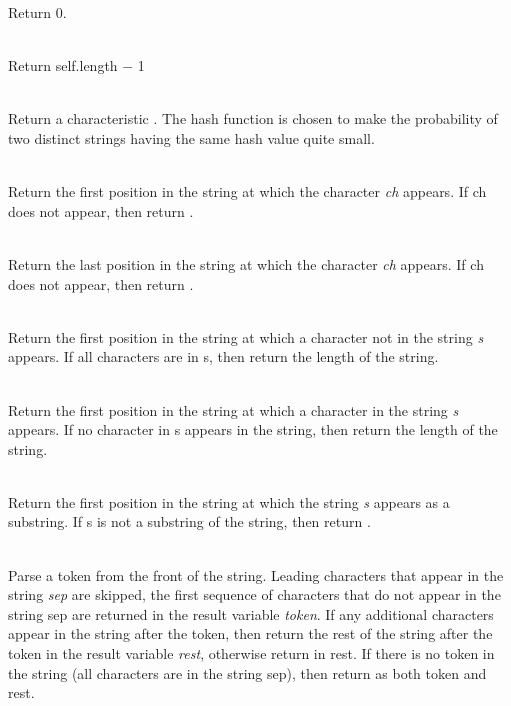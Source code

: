 \begin{desc}
    Return 0.
  \item[\kw{function} upperbound \returns{} \/\LB{}\tn{Integer}\/\RB{}]~\\
    Return self.length $-$ 1
  \item[\kw{function} hash \returns{} \/\LB{}\tn{Integer}\/\RB{}]~\\
    Return a characteristic .  The hash function is chosen to
    make the probability of two distinct strings having the same hash value
    quite small.
  \item[\kw{function} index\/\LB{}ch \CO{} \tn{Character}\/\RB{} \returns{} \/\LB{}r \CO{} \tn{Integer}\/\RB{}]~\\
    Return the first position in the string at which the character {\it ch}
    appears.  If ch does not appear, then return .
  \item[\kw{function} rindex\/\LB{}ch \CO{} \tn{Character}\/\RB{} \returns{}
	  \/\LB{}r \CO{} \tn{Integer}\/\RB{}]~\\
    Return the last position in the string at which the character {\it ch}
    appears.  If ch does not appear, then return .
  \item[\kw{function} span\/\LB{}s \CO{} \tn{String}\/\RB{} \returns{} \/\LB{}r \CO{} \tn{Integer}\/\RB{}]~\\
    Return the first position in the string at which a character not in the
    string {\it s} appears.  If all characters are in s, then return the
    length of the string.
  \item[\kw{function} cspan\/\LB{}s \CO{} \tn{String}\/\RB{} \returns{} \/\LB{}r \CO{} \tn{Integer}\/\RB{}]~\\
    Return the first position in the string at which a character in the
    string {\it s} appears.  If no character in s appears in the string,
    then return the length of the string.
  \item[\kw{function} str\/\LB{}s \CO{} \tn{String}\/\RB{} \returns{} \/\LB{}r \CO{} \tn{Integer}\/\RB{}]~\\
    Return the first position in the string at which the string {\it s}
    appears as a substring.  If s is not a substring of the string, then
    return .
  \item[\kw{operation} token\/\LB{}sep \CO{} \tn{String}\/\RB{} \returns{} \/\LB{}token \CO{} \tn{String}, rest\CO{} \tn{String}\/\RB{}]~\\
    Parse a token from the front of the string.  Leading characters that
    appear in the string {\it sep} are skipped, the first sequence of
    characters that do not appear in the string sep are returned in the
    result variable {\it token}.  If any additional characters appear in the
    string after the token, then return the rest of the string after the token
    in the result variable {\it rest}, otherwise return  in rest.
    If there is no token in the string (all characters are in the string
    sep), then return  as both token and rest.
\end{desc}


